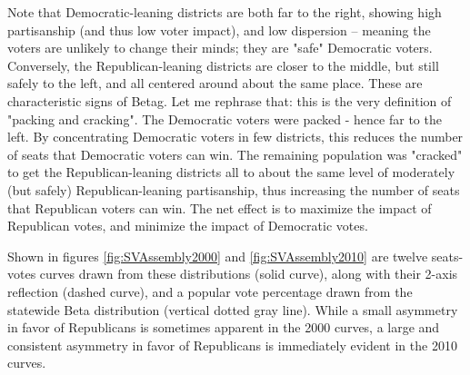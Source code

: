 \documentclass[preprint,12pt]{article}
\begin{document}
 
Note that Democratic-leaning districts are both far to the right, showing high partisanship (and thus low voter impact), and low dispersion -- meaning the voters are unlikely to change their minds; they are "safe" Democratic voters.  Conversely, the Republican-leaning districts are closer to the middle, but still safely to the left, and all centered around about the same place.   These are characteristic signs of Betag.  Let me rephrase that: this is the very definition of "packing and cracking".  The Democratic voters were packed - hence far to the left.  By concentrating Democratic voters in few districts, this reduces the number of seats that Democratic voters can win.  The remaining population was "cracked" to get the Republican-leaning districts all to about the same level of moderately (but safely) Republican-leaning partisanship, thus increasing the number of seats that Republican voters can win.  The net effect is to maximize the impact of Republican votes, and minimize the impact of Democratic votes.
 
Shown in figures \ref{fig:SVAssembly2000} and \ref{fig:SVAssembly2010} are twelve seats-votes curves drawn from these distributions (solid curve), along with their 2-axis reflection (dashed curve), and a popular vote percentage drawn from the statewide Beta distribution (vertical dotted gray line). 
While a small asymmetry in favor of Republicans is sometimes apparent in the 2000 curves, a large and consistent asymmetry in favor of Republicans is immediately evident in the 2010 curves.
\end{document}
